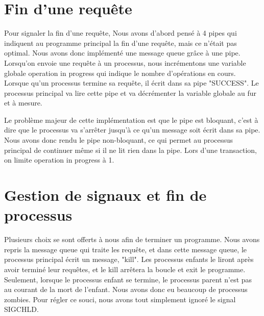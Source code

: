 \documentclass[utf8]{article}
\begin{document}
\section{Fin d'une requête}

\indent{}
\par

Pour signaler la fin d'une requête, Nous avons d'abord pensé à 4 pipes qui indiquent au programme principal 
la fin d'une requête, mais ce n'était pas optimal. Nous avons donc implémenté une message queue grâce à une pipe. Lorsqu'on envoie 
une requête à un processus, nous incrémentons une variable globale operation in progress qui indique le nombre d'opérations en cours.
Lorsque qu'un processus termine sa requête, il écrit dans sa pipe "SUCCESS". Le processus principal va lire cette pipe et va décrémenter
la variable globale au fur et à mesure. 
\par
\indent{}
\par
Le problème majeur de cette implémentation est que le pipe est bloquant, c'est à dire que le processus
va s'arrêter jusqu'à ce qu'un message soit écrit dans sa pipe. Nous avons donc rendu le pipe non-bloquant, ce qui permet au processus principal de continuer
même si il ne lit rien dans la pipe. Lors d'une transaction, on limite operation in progress à 1.
\par

\section{Gestion de signaux et fin de processus}
\indent{}
\par
Plusieurs choix se sont offerts à nous afin de terminer un programme.
Nous avons repris la message queue qui traite les requête, et dans 
cette message queue, le processus principal écrit un message, "kill". Les processus enfants le liront après avoir terminé leur requêtes,
et le kill arrêtera la boucle et exit le programme.
Seulement, lorsque le processus enfant se termine, le processus parent n'est pas au courant de la mort de l'enfant. Nous avons donc eu 
beaucoup de processus zombies. Pour régler ce souci, nous avons tout simplement ignoré le signal SIGCHLD.
\par
\end{document}
